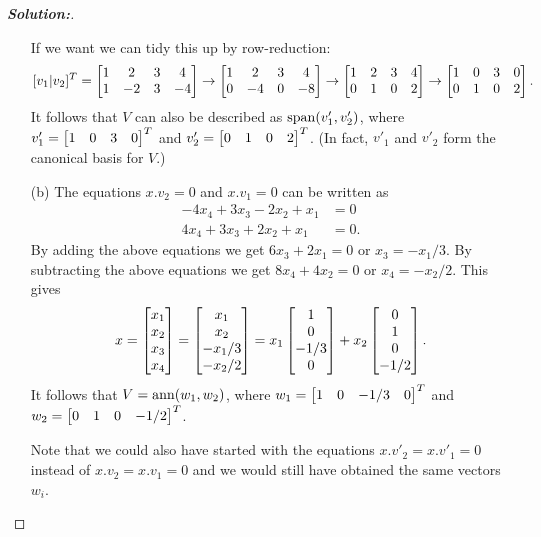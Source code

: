 \documentclass[a4paper]{amsart}
\theoremstyle{definition}
\newenvironment{solution}{\begin{proof}[\textbf{Solution:}] \vphantom{u}}{\end{proof}}
\begin{document}
\begin{solution}
\begin{itemize}
   If we want we can tidy this up by row-reduction:
   \[ [v_1|v_2]^T = 
      \bbm 1 & 2 & 3 & 4 \\ 1 & -2 & 3 & -4 \ebm \to
      \bbm 1 & 2 & 3 & 4 \\ 0 & -4 & 0 & -8 \ebm \to
      \bbm 1 & 2 & 3 & 4 \\ 0 &  1 & 0 &  2 \ebm \to
      \bbm 1 & 0 & 3 & 0 \\ 0 &  1 & 0 &  2 \ebm.
   \]
   It follows that $V$ can also be described as $\spn(v'_1,v'_2)$,
   where $v'_1=\bbm 1&0&3&0\ebm^T$ and $v'_2=\bbm 0&1&0&2\ebm^T$.
   (In fact, $v'_1$ and $v'_2$ form the canonical basis for $V$.)
  \item[(b)] The equations $x.v_2=0$ and $x.v_1=0$ can be written as 
   \begin{align*}
    -4x_4+3x_3-2x_2+x_1 &= 0 \\
     4x_4+3x_3+2x_2+x_1 &= 0.
   \end{align*}
   By adding the above equations we get $6x_3+2x_1=0$ or
   $x_3=-x_1/3$.  By subtracting the above equations we get
   $8x_4+4x_2=0$ or $x_4=-x_2/2$.  This gives
   \[ x = \left[\begin{matrix} x_1\\x_2\\x_3\\x_4\end{matrix}\right] 
        = \left[\begin{matrix} x_1\\x_2\\-x_1/3\\-x_2/2\end{matrix}\right] 
        = x_1 \left[\begin{matrix} 1\\0\\-1/3\\0\end{matrix}\right] + 
          x_2 \left[\begin{matrix} 0\\1\\0\\-1/2\end{matrix}\right].
   \]
   It follows that $V=\operatorname{ann}(w_1,w_2)$, where
   $w_1=\left[\begin{matrix} 1&0&-1/3&0\end{matrix}\right]^T$ and $w_2=\left[\begin{matrix} 0&1&0&-1/2\end{matrix}\right]^T$.

   Note that we could also have started with the equations
   $x.v'_2=x.v'_1=0$ instead of $x.v_2=x.v_1=0$ and we would still
   have obtained the same vectors $w_i$.
 \end{itemize}
\end{solution}
\end{document}
